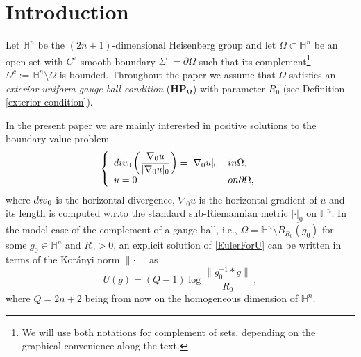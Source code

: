 \documentclass[10pt]{amsart}
\numberwithin{equation}{section}
\theoremstyle{definition}
\newcommand{\He}{\mathbb{H}}
\begin{document}
\section{Introduction}
Let $\He^n$ be the $(2n+1)$-dimensional Heisenberg group and let $\Omega \subset \He^n$ be an open set with $C^2$-smooth boundary $\Sigma_0=\partial\Omega$ such that its complement\footnote{We will use both notations for complement of sets, depending on the graphical convenience along the text.} $\Omega^c := \He^n \setminus \Omega$ is bounded.
Throughout the paper we assume that $\Omega$ satisfies an {\it exterior uniform gauge-ball
condition}  ($\mathbf{HP_\Omega}$) with parameter $R_0$ (see Definition \ref{exterior-condition}). 


In the present paper we are mainly interested in positive solutions to the boundary value problem
\begin{equation}\label{EulerForU}
\left\{ \begin{array}{ll}
            {\rm div}_0 \left( \dfrac{\nabla_0 u}{|\nabla_0 u|_0}\right) = |\nabla_0 u|_0 & \textrm{in } \Omega,\\
						u= 0 & \textrm{on } \partial \Omega, 
        \end{array}\right.
\end{equation}
where $\rm{div}_0$ is the horizontal divergence, $\nabla_0 u$ is the horizontal gradient of $u$ and its length is computed w.r.to the standard sub-Riemannian metric $| \cdot |_0$ on $\He^n$. In the model case of the complement of a  gauge-ball, i.e., $\Omega=\He^n \setminus \overline{B_{R_0}(g_0)}$ for some $g_0 \in \He^n$ and $R_0>0$, an explicit solution of \eqref{EulerForU} can be written in terms of the Kor\'anyi norm $\|\cdot\|$ as 
\begin{equation}
\label{explicitsolution}
U(g)=(Q-1) \log \frac{\| g_0^{-1} * g\|}{R_0} \, ,
\end{equation} 
where $Q=2n+2$ being from now on the homogeneous dimension of $\mathbb{H}^n$.
\end{document}
